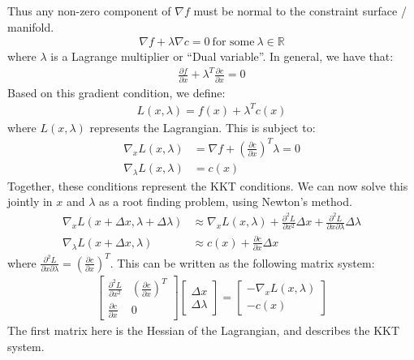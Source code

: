 \noindent
Thus any non-zero component of $\nabla f$ must be normal to the constraint surface / manifold. 
\begin{align}
    \nabla f + \lambda \nabla c = 0 \ \textrm{for some} \ \lambda \in \mathbb{R}
\end{align}
where $\lambda$ is a Lagrange multiplier or ``Dual variable''. In general, we have that:
\begin{align}
    \frac{\partial f}{\partial x} + \lambda^T \frac{\partial c}{\partial x} = 0
\end{align}
Based on this gradient condition, we define: 
\begin{align}
    L(x,\lambda) = f(x) + \lambda^T c(x)
\end{align}
where $L(x, \lambda)$ represents the Lagrangian. This is subject to: 
\begin{align}
    \nabla_x L(x,\lambda) &= \nabla f + (\frac{\partial c}{\partial x})^T \lambda = 0 \\
    \nabla_{\lambda} L(x,\lambda) &= c(x)
\end{align}
Together, these conditions represent the KKT conditions. We can now solve this jointly in $x$ and $\lambda$ as a root finding problem, using Newton's method. 
\begin{align}
    \nabla_x L (x + \Delta x, \lambda + \Delta \lambda) &\approx \nabla_x L (x, \lambda) + \frac{\partial^2 L}{\partial x^2} \Delta x + \frac{\partial^2 L}{\partial x \partial \lambda} \Delta \lambda  \\
    \nabla_{\lambda} L (x + \Delta x, \lambda) &\approx c(x) + \frac{\partial c}{\partial x} \Delta x
\end{align}
where $\frac{\partial^2 L}{\partial x \partial \lambda} = (\frac{\partial c}{\partial x})^T$. 
This can be written as the following matrix system:
\begin{align}
    \begin{bmatrix}
        \frac{\partial^2 L}{\partial x^2}  &  (\frac{\partial c}{\partial x})^T \\
        \frac{\partial c}{\partial x} & 0 
    \end{bmatrix}
    \begin{bmatrix}
        \Delta x \\
        \Delta \lambda
    \end{bmatrix}
    = 
    \begin{bmatrix}
        -\nabla_x L(x,\lambda) \\
        - c(x)
    \end{bmatrix}
\end{align}
The first matrix here is the Hessian of the Lagrangian, and describes the KKT system. 

